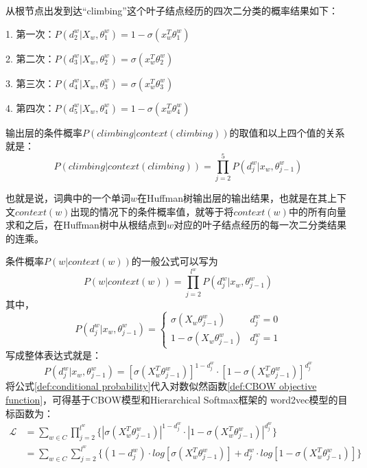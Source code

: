 从根节点出发到达“climbing”这个叶子结点经历的四次二分类的概率结果如下：

1. 第一次：$P(d_{2}^{w}|X_w, \theta_{1}^{w}) = 1- \sigma(x_{w}^{T}\theta_{1}^{w})$

2. 第二次：$P(d_{3}^{w}|X_w, \theta_{2}^{w}) = \sigma(x_{w}^{T}\theta_{2}^{w})$

3. 第三次：$P(d_{4}^{w}|X_w, \theta_{3}^{w}) = \sigma(x_{w}^{T}\theta_{3}^{w})$

4. 第四次：$P(d_{5}^{w}|X_w, \theta_{4}^{w}) = 1- \sigma(x_{w}^{T}\theta_{4}^{w})$

输出层的条件概率$P(climbing|context(climbing))$的取值和以上四个值的关系就是：
\begin{equation}
P(climbing|context(climbing)) = \prod_{j=2}^{5}P(d_{j}^{w}|x_w,\theta_{j-1}^{w})
\end{equation}

也就是说，词典中的一个单词$w$在Huffman树输出层的输出结果，也就是在其上下文$context(w)$出现的情况下的条件概率值，就等于将$context(w)$中的所有向量求和之后，在Huffman树中从根结点到$w$对应的叶子结点经历的每一次二分类结果的连乘。

条件概率$P(w|context(w))$的一般公式可以写为
\begin{equation}
P(w|context(w)) = \prod_{j=2}^{l^w}P(d_{j}^{w}|x_w,\theta_{j-1}^{w})
\label{def:conditional probability}
\end{equation}
其中，
\begin{equation}
P(d_{j}^{w}|x_w,\theta_{j-1}^{w}) =\left\{\begin{matrix}

\sigma(X_w\theta_{j-1}^{w}) & d_{j}^{w} = 0

\\
1-\sigma(X_w\theta_{j-1}^{w}) & d_{j}^{w} = 1
\end{matrix}\right.
\end{equation}
写成整体表达式就是：
\begin{equation}
P(d_{j}^{w}|x_w,\theta_{j-1}^{w}) = [\sigma(X_{w}^{T}\theta_{j-1}^{w})]^{1-d_{j}^{w}}\cdot [1-\sigma(X_{w}^{T}\theta_{j-1}^{w})]^{d_{j}^{w}}
\end{equation}
将公式\ref{def:conditional probability}代入对数似然函数\ref{def:CBOW objective function}，可得基于CBOW模型和Hierarchical Softmax框架的
word2vec模型的目标函数为：
\begin{equation}
\begin{aligned}
 \mathcal{L} &= \sum_{w\in C}\prod_{j=2}^{l^{w}} \{|\sigma(X_{w}^{T}\theta_{j-1}^{w})|^{1-d_{j}^{w}} \cdot |1-\sigma(X_{w}^{T}\theta_{j-1}^{w})|^{d_{j}^{w}}\}  \\
&=\sum_{w \in C}\sum_{j=2}^{l^{w}}\{(1-d_{j}^{w})\cdot log[\sigma(X_{w}^{T}\theta_{j-1}^{w})]  +  d_{j}^{w}\cdot log[1-\sigma(X_{w}^{T}\theta_{j-1}^{w})]\} 
\end{aligned}
\end{equation}

